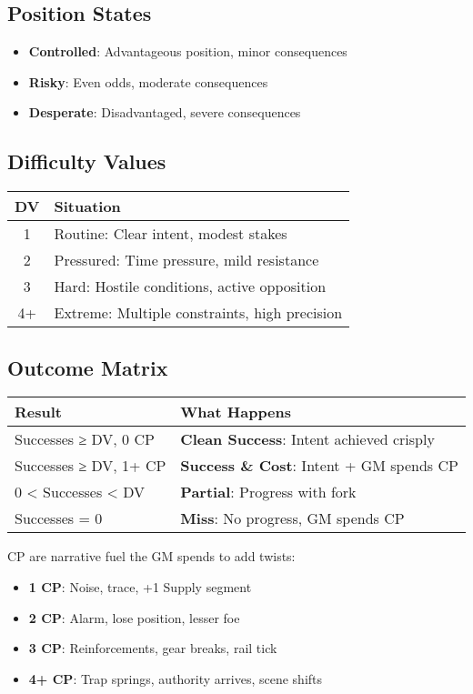 \documentclass[11pt]{article}
\begin{document}
\subsection{Position States}
\begin{itemize}
    \item \textbf{Controlled}: Advantageous position, minor consequences
    \item \textbf{Risky}: Even odds, moderate consequences
    \item \textbf{Desperate}: Disadvantaged, severe consequences
\end{itemize}

\subsection{Difficulty Values}
\begin{center}
\begin{tabular}{cl}
\toprule
\textbf{DV} & \textbf{Situation} \\
\midrule
1 & Routine: Clear intent, modest stakes \\
2 & Pressured: Time pressure, mild resistance \\
3 & Hard: Hostile conditions, active opposition \\
4+ & Extreme: Multiple constraints, high precision \\
\bottomrule
\end{tabular}
\end{center}

\subsection{Outcome Matrix}
\begin{center}
\begin{tabular}{ll}
\toprule
\textbf{Result} & \textbf{What Happens} \\
\midrule
Successes ≥ DV, 0 CP & \textbf{Clean Success}: Intent achieved crisply \\
Successes ≥ DV, 1+ CP & \textbf{Success \& Cost}: Intent + GM spends CP \\
0 < Successes < DV & \textbf{Partial}: Progress with fork \\
Successes = 0 & \textbf{Miss}: No progress, GM spends CP \\
\bottomrule
\end{tabular}
\end{center}

\begin{fatebox}
CP are narrative fuel the GM spends to add twists:
\begin{itemize}
    \item \textbf{1 CP}: Noise, trace, +1 Supply segment
    \item \textbf{2 CP}: Alarm, lose position, lesser foe
    \item \textbf{3 CP}: Reinforcements, gear breaks, rail tick
    \item \textbf{4+ CP}: Trap springs, authority arrives, scene shifts
\end{itemize}
\end{fatebox}
\end{document}
